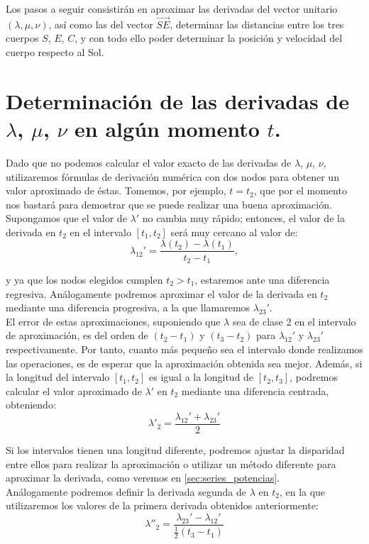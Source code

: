 \documentclass[11pt]{book}
\begin{document}
Los pasos a seguir consistirán en aproximar las derivadas del vector unitario $(\lambda,\mu,\nu)$, así como las del vector $\overrightarrow{SE}$, determinar las distancias entre los tres cuerpos $S$, $E$, $C$, y con todo ello poder determinar la posición y velocidad del cuerpo respecto al Sol.\\

\section{Determinación de las derivadas de $\lambda$, $\mu$, $\nu$ en algún momento $t$.}
\label{sec:primera_segunda_derivada}
Dado que no podemos calcular el valor exacto de las derivadas de $\lambda$, $\mu$, $\nu$, utilizaremos fórmulas de derivación numérica con dos nodos para obtener un valor aproximado de éstas. Tomemos, por ejemplo, $t=t_2$, que por el momento nos bastará para demostrar que se puede realizar una buena aproximación. Supongamos que el valor de $\lambda'$ no cambia muy rápido; entonces, el valor de la derivada en $t_2$ en el intervalo $[t_1,t_2]$ será muy cercano al valor de:
\[
\lambda_{12}'=\frac{\lambda(t_2)-\lambda(t_1)}{t_2-t_1},
\]

\noindent y ya que los nodos elegidos cumplen $t_2>t_1$, estaremos ante una diferencia regresiva. Análogamente podremos aproximar el valor de la derivada en $t_2$ mediante una diferencia progresiva, a la que llamaremos $\lambda_{23}'$.\\

El error de estas aproximaciones, suponiendo que $\lambda$ sea de clase 2 en el intervalo de aproximación, es del orden de $(t_2-t_1)$ y $(t_3-t_2)$ para $\lambda_{12}'$ y $\lambda_{23}'$ respectivamente. Por tanto, cuanto más pequeño sea el intervalo donde realizamos las operaciones, es de esperar que la aproximación obtenida sea mejor. Además, si la longitud del intervalo $[t_1,t_2]$ es igual a la longitud de $[t_2,t_3]$, podremos calcular el valor aproximado de $\lambda'$ en $t_2$ mediante una diferencia centrada, obteniendo:
\[
\lambda'_2=\frac{\lambda_{12}'+\lambda_{23}'}{2}
\]

Si los intervalos tienen una longitud diferente, podremos ajustar la disparidad entre ellos para realizar la aproximación o utilizar un método diferente para aproximar la derivada, como veremos en \ref{sec:series_potencias}.\\

Análogamente podremos definir la derivada segunda de $\lambda$ en $t_2$, en la que utilizaremos los valores de la primera derivada obtenidos anteriormente:
\[
\lambda''_2=\frac{\lambda_{23}'-\lambda_{12}'}{\frac{1}{2}(t_3-t_1)}
\]
\end{document}

